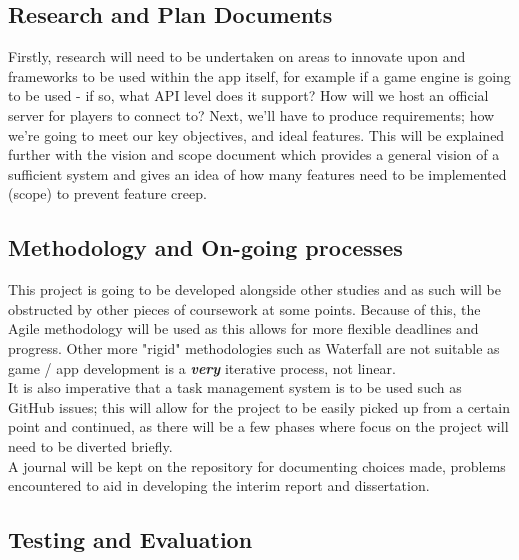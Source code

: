 \documentclass[11pt]{article}
\begin{document}
{\subsection*{Research and Plan Documents}

Firstly, research will need to be undertaken on areas to innovate upon and frameworks to be used within the app itself, for example if a game engine is going to be used - if so, what API level does it support? How will we host an official server for players to connect to? Next, we'll have to produce requirements; how we're going to meet our key objectives, and ideal features. This will be explained further with the vision and scope document which provides a general vision of a sufficient system and gives an idea of how many features need to be implemented (scope) to prevent feature creep.


\subsection*{Methodology and On-going processes}

This project is going to be developed alongside other studies and as such will be obstructed by other pieces of coursework at some points. Because of this, the Agile methodology will be used as this allows for more flexible deadlines and progress. Other more "rigid" methodologies such as Waterfall are not suitable as game / app development is a \textbf{\textit{very}} iterative process, not linear. \\ 




It is also imperative that a task management system is to be used such as GitHub issues; this will allow for the project to be easily picked up from a certain point and continued, as there will be a few phases where focus on the project will need to be diverted briefly. \\

A journal will be kept on the repository for documenting choices made, problems encountered to aid in developing the interim report and dissertation. \\

\subsection*{Testing and Evaluation}

}
\end{document}
